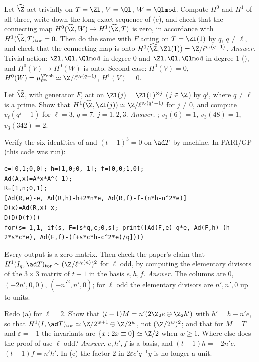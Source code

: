 \begin{exercise}\label{ex:cohomology:tvw}
Let $\widehat\Z$ act trivially on $T=\Zl$, $V=\Ql$, $W=\Qlmod$. Compute $H^0$ and $H^1$ of all three, write down the long exact sequence of
(c), and check that the connecting map $H^0(\widehat\Z,W)\to H^1(\widehat\Z,T)$ is zero, in accordance with $H^1(\widehat\Z,T)_{\mathrm{tor}}=0$.
Then do the same with $F$ acting on $T=\Zl(1)$ by $q$, $q\ne\ell$, and check that the connecting map is onto $H^1(\widehat\Z,\Zl(1))=\Z/\ell^{v_\ell(q-1)}$.
\emph{Answer.} Trivial action: $\Zl,\Ql,\Qlmod$ in degree $0$ and $\Zl,\Ql,\Qlmod$ in degree $1$ (), and $H^0(V)\to H^0(W)$ is onto.
Second case: $H^0(V)=0$, $H^0(W)=\mu_{\ell^\infty}^{\Frob}\simeq\Z/\ell^{v_\ell(q-1)}$, $H^1(V)=0$.
\end{exercise}

\begin{exercise}\label{ex:cohomology:twists}
Let $\widehat\Z$, with generator $F$, act on $\Zl(j)=\Zl(1)^{\otimes j}$ ($j\in\Z$) by $q^j$, where $q\ne\ell$ is a prime. Show that $H^1(\widehat\Z,\Zl(j))\simeq\Z/\ell^{v_\ell(q^j-1)}$ for $j\ne0$, and
compute $v_\ell(q^j-1)$ for $\ell=3$, $q=7$, $j=1,2,3$.
\emph{Answer.} ; $v_3(6)=1$, $v_3(48)=1$, $v_3(342)=2$.
\end{exercise}

\begin{exercise}\label{ex:cohomology:identities}
Verify the six identities of  and $(t-1)^3=0$ on $\ad T$ by machine. In PARI/GP (this code was run):
\begin{lstlisting}[language=GP]
e=[0,1;0,0]; h=[1,0;0,-1]; f=[0,0;1,0];
Ad(A,x)=A*x*A^(-1);
R=[1,n;0,1];
[Ad(R,e)-e, Ad(R,h)-h+2*n*e, Ad(R,f)-f-(n*h-n^2*e)]
D(x)=Ad(R,x)-x;
D(D(D(f)))
for(s=-1,1, if(s, F=[s*q,c;0,s]; print([Ad(F,e)-q*e, Ad(F,h)-(h-2*s*c*e), Ad(F,f)-(f+s*c*h-c^2*e)/q])))
\end{lstlisting}
Every output is a zero matrix. Then check the paper's claim that $H^1(I_q,\ad T)_{\mathrm{tor}}\simeq(\Z/\ell^{v_\ell(n)})^2$ for $\ell$ odd, by computing the elementary divisors of the
$3\times3$ matrix of $t-1$ in the basis $e,h,f$.
\emph{Answer.} The columns are $0$, $(-2n',0,0)$, $(-n'^2,n',0)$; for $\ell$ odd the elementary divisors are $n',n',0$ up to units.
\end{exercise}

\begin{exercise}\label{ex:cohomology:ell2}
Redo (a) for $\ell=2$. Show that $(t-1)M=n'(2\Z_2e\oplus\Z_2h')$ with $h'=h-n'e$, so that $H^1(I,\ad T)_{\mathrm{tor}}\simeq\Z/2^{w+1}\oplus\Z/2^w$, not $(\Z/2^w)^2$; and that
for $M=T$ and $\varepsilon=-1$ the invariants are $\{x:2x\equiv0\}\simeq\Z/2$ when $w\ge1$. Where else does the proof of  use $\ell$ odd?
\emph{Answer.} $e,h',f$ is a basis, and $(t-1)h=-2n'e$, $(t-1)f=n'h'$. In (c) the factor $2$ in $2\varepsilon c'q^{-1}y$ is no longer a unit.
\end{exercise}

